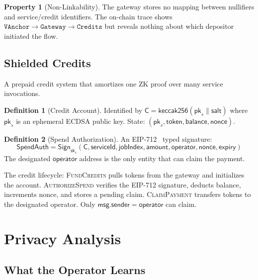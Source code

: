 \documentclass[11pt,a4paper]{article}
\theoremstyle{definition}
\newtheorem{definition}{Definition}
\newtheorem{property}{Property}
\begin{document}
\begin{property}[Non-Linkability]
The gateway stores no mapping between nullifiers and service/credit identifiers. The on-chain trace shows $\texttt{VAnchor} \to \texttt{Gateway} \to \texttt{Credits}$ but reveals nothing about which depositor initiated the flow.
\end{property}

\subsection{Shielded Credits}\label{sec:credits}

A prepaid credit system that amortizes one ZK proof over many service invocations.

\begin{definition}[Credit Account]
Identified by $\mathsf{C} = \mathsf{keccak256}(\mathsf{pk}_s \| \mathsf{salt})$ where $\mathsf{pk}_s$ is an ephemeral ECDSA public key. State: $(\mathsf{pk}_s, \mathsf{token}, \mathsf{balance}, \mathsf{nonce})$.
\end{definition}

\begin{definition}[Spend Authorization]
An EIP-712~\cite{eip712} typed signature:
$$\mathsf{SpendAuth} = \mathsf{Sign}_{\mathsf{sk}_s}(\mathsf{C}, \mathsf{serviceId}, \mathsf{jobIndex}, \mathsf{amount}, \mathsf{operator}, \mathsf{nonce}, \mathsf{expiry})$$
The designated $\mathsf{operator}$ address is the only entity that can claim the payment.
\end{definition}

The credit lifecycle: \textsc{FundCredits} pulls tokens from the gateway and initializes the account. \textsc{AuthorizeSpend} verifies the EIP-712 signature, deducts balance, increments nonce, and stores a pending claim. \textsc{ClaimPayment} transfers tokens to the designated operator. Only $\mathsf{msg.sender} = \mathsf{operator}$ can claim.

\section{Privacy Analysis}

\subsection{What the Operator Learns}
\end{document}
